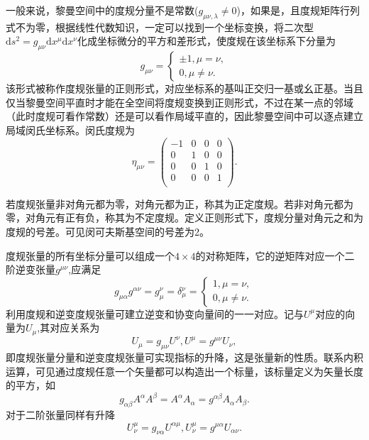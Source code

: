\documentclass[11pt, a4paper, oneside, onecolumn]{ctexart}
\numberwithin{equation}{subsection}
\begin{document}
一般来说，黎曼空间中的度规分量不是常数($g_{\mu\nu,\lambda}\ne0$)，如果是，且度规矩阵行列式不为零，根据线性代数知识，一定可以找到一个坐标变换，将二次型$\mathrm{d}s^{2}=g_{\mu\nu}\mathrm{d}x^{\mu}\mathrm{d}x^{\nu}$化成坐标微分的平方和差形式，使度规在该坐标系下分量为
\begin{equation}
g_{\mu\nu}=
\begin{cases}
\pm1,\mu=\nu,\\
0,\mu\ne\nu.
\end{cases}
\end{equation}
该形式被称作度规张量的正则形式，对应坐标系的基叫正交归一基或幺正基。当且仅当黎曼空间平直时才能在全空间将度规变换到正则形式，不过在某一点的邻域（此时度规可看作常数）还是可以看作局域平直的，因此黎曼空间中可以逐点建立局域闵氏坐标系。闵氏度规为
\begin{equation}
\eta_{\mu\nu}=
\begin{pmatrix}
-1 & 0 & 0 & 0\\
0 & 1 & 0 & 0\\
0 & 0 & 1 & 0\\
0 & 0 & 0 & 1\\
\end{pmatrix}.
\end{equation}

若度规张量非对角元都为零，对角元都为正，称其为正定度规。若非对角元都为零，对角元有正有负，称其为不定度规。定义正则形式下，度规分量对角元之和为度规的号差。可见闵可夫斯基空间的号差为2。

度规张量的所有坐标分量可以组成一个$4\times4$的对称矩阵，它的逆矩阵对应一个二阶逆变张量$g^{\mu\nu}$,应满足
\begin{equation}
g_{\mu\alpha}g^{\alpha\nu}=g^{\nu}_{\mu}=\delta{}_{\mu}^{\nu}=
\begin{cases}
1,\mu=\nu,\\
0,\mu\ne\nu.
\end{cases}
\end{equation}
利用度规和逆变度规张量可建立逆变和协变向量间的一一对应。记与$U^{\mu}$对应的向量为$U_{\mu}$,其对应关系为
\begin{equation}
U_{\mu}=g_{\mu\nu}U^{\nu},U^{\mu}=g^{\mu\nu}U_{\nu},
\end{equation}
即度规张量分量和逆变度规张量可实现指标的升降，这是张量新的性质。联系内积运算，可见通过度规任意一个矢量都可以构造出一个标量，该标量定义为矢量长度的平方，如
\begin{equation}
g_{\alpha\beta}A^{\alpha}A^{\beta}=A^{\alpha}A_{\alpha}=g^{\alpha\beta}A_{\alpha}A_{\beta}.
\end{equation}
对于二阶张量同样有升降
\begin{equation}
U_{\nu}^{\mu}=g_{\nu\alpha}U^{\alpha\mu},U_{\nu}^{\mu}=g^{\mu\alpha}U_{\alpha\nu}.
\end{equation}
\end{document}
